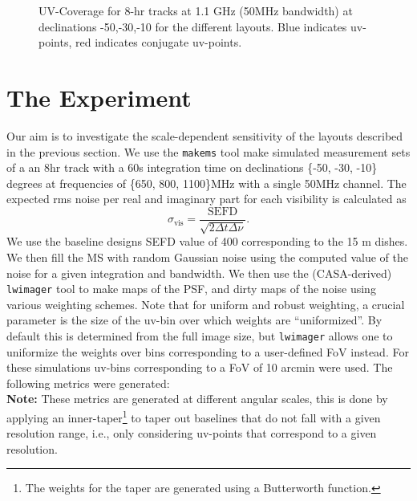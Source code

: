 \documentclass[sfheadings,a4paper,10pt,floats,floatfix]{article}
\begin{document}
\begin{figure}[H]
 \tiny{}
 \caption{UV-Coverage for 8-hr tracks at 1.1 GHz (50MHz bandwidth) at declinations -50,-30,-10 for the different layouts. Blue
indicates uv-points, red indicates conjugate uv-points.}\label{fig:uvcov}
\end{figure}

\section{The Experiment}\label{sec:exp}
Our aim is to investigate the scale-dependent sensitivity of the layouts described in the previous section.
We use the \texttt{makems} tool make simulated measurement sets of a an 8hr track with a 60s integration time on declinations
\{-50, -30, -10\} degrees at frequencies of \{650, 800, 1100\}MHz with a single 50MHz channel. The expected rms noise per real
and imaginary part for each visibility is calculated as 
\begin{equation}
\sigma_{\text{vis}} = \frac{\text{SEFD}}{\sqrt{2\Delta t\Delta \nu}}.
\end{equation}
We use the baseline designs SEFD value of 400 corresponding to the 15 m dishes. We then fill the MS with random Gaussian noise
using the computed value of the noise for a given integration and bandwidth. We then use the (CASA-derived) \texttt{lwimager} tool
to make maps of the PSF, and dirty maps of the noise using various weighting schemes. Note that for uniform and robust weighting,
a crucial parameter is the size of the uv-bin over which weights are “uniformized”. By default this is determined from the full
image size, but \texttt{lwimager} allows one to uniformize the weights over bins corresponding to a user-defined FoV instead. For
these simulations uv-bins corresponding to a FoV of 10 arcmin were used. The following metrics were generated:\\ {\bf Note:} These
metrics are generated at different angular scales, this is done by applying an inner-taper\footnote{The weights for the taper
are generated using a Butterworth function.} to taper out baselines
that do not fall with a given resolution range, i.e., only
considering uv-points that correspond to a given resolution.
\end{document}
